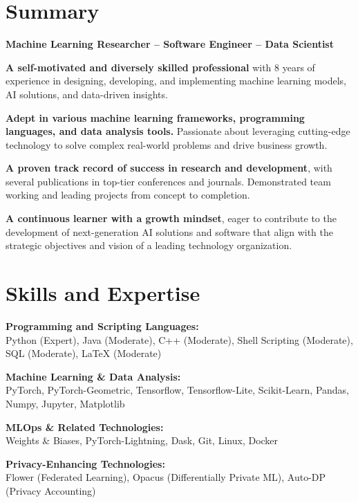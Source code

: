\documentclass[11pt]{article}
\begin{document}
\maketitle

\section{Summary}

\begin{outerlist}
	\item \textbf{Machine Learning Researcher -- Software Engineer -- Data Scientist}
	\begin{innerlist}
		\item \textbf{A self-motivated and diversely skilled professional} with 8 years of experience in designing, developing, and implementing machine learning models, AI solutions, and data-driven insights.
    \item \textbf{Adept in various machine learning frameworks, programming languages, and data analysis tools.} Passionate about leveraging cutting-edge technology to solve complex real-world problems and drive business growth.
    \item \textbf{A proven track record of success in research and development}, with several publications in top-tier conferences and journals. Demonstrated team working and leading projects from concept to completion.
    \item \textbf{A continuous learner with a growth mindset}, eager to contribute to the development of next-generation AI solutions and software that align with the strategic objectives and vision of a leading technology organization.
	\end{innerlist}
\end{outerlist}


\section{Skills and Expertise}

\begin{outerlist}
	\item \textbf{Programming and Scripting Languages:}\\
	{Python (Expert), Java (Moderate), C++ (Moderate), Shell Scripting (Moderate), SQL (Moderate), LaTeX (Moderate)}

	\item \textbf{Machine Learning \& Data Analysis:}\\
	{PyTorch, PyTorch-Geometric, Tensorflow, Tensorflow-Lite, Scikit-Learn, Pandas, Numpy, Jupyter, Matplotlib}

	\item \textbf{MLOps \& Related Technologies:}\\
	{Weights \& Biases, PyTorch-Lightning, Dask, Git, Linux, Docker}

	\item \textbf{Privacy-Enhancing Technologies:}\\
	{Flower (Federated Learning), Opacus (Differentially Private ML), Auto-DP (Privacy Accounting)}

\end{outerlist}
\end{document}
